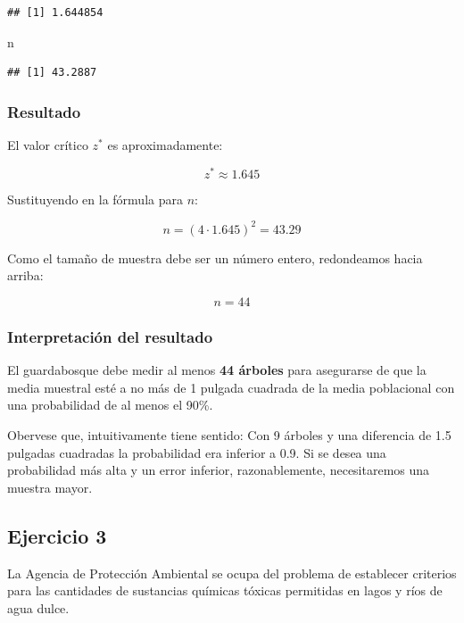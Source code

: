 \documentclass[
]{article}
\newenvironment{Shaded}{\begin{snugshade}}{\end{snugshade}}
\newcommand{\NormalTok}[1]{#1}
\begin{document}
\begin{verbatim}
## [1] 1.644854
\end{verbatim}

\begin{Shaded}
\begin{Highlighting}[]
\NormalTok{n}
\end{Highlighting}
\end{Shaded}

\begin{verbatim}
## [1] 43.2887
\end{verbatim}

\subsubsection{Resultado}\label{resultado-2}

El valor crítico \(z^*\) es aproximadamente:

\[
z^* \approx 1.645
\]

Sustituyendo en la fórmula para \(n\):

\[
n = (4 \cdot 1.645)^2 = 43.29
\]

Como el tamaño de muestra debe ser un número entero, redondeamos hacia arriba:

\[
n = 44
\]

\subsubsection{Interpretación del resultado}\label{interpretaciuxf3n-del-resultado}

El guardabosque debe medir al menos \textbf{44 árboles} para asegurarse de que la media muestral esté a no más de 1 pulgada cuadrada de la media poblacional con una probabilidad de al menos el 90\%.

Obervese que, intuitivamente tiene sentido: Con 9 árboles y una diferencia de 1.5 pulgadas cuadradas la probabilidad era inferior a 0.9. Si se desea una probabilidad más alta y un error inferior, razonablemente, necesitaremos una muestra mayor.

\subsection{Ejercicio 3}\label{ejercicio-3-1}

La Agencia de Protección Ambiental se ocupa del problema de establecer criterios para las cantidades de sustancias químicas tóxicas permitidas en lagos y ríos de agua dulce.
\end{document}
